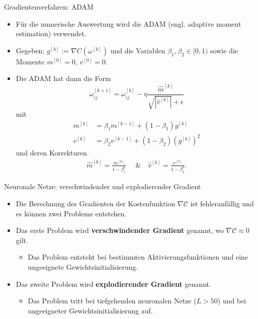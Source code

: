 \begin{frame}{Gradientenverfahren: ADAM}
    \begin{itemize}
        \item<1-> Für die numerische Auswertung wird die ADAM (engl. adaptive moment estimation) verwendet.
        \item<2-> Gegeben: $g^{[k]} := \nabla C(\omega^{[k]})$ und die Variablen $\beta_1,\beta_2 \in [0,1)$ sowie die Momente $m^{[0]}=0$,
        $v^{[0]}=0$.
        \item<3-> Die ADAM hat dann die Form
        \[
            \omega_{ij}^{[k+1]}= \omega_{ij}^{[k]} - \eta \frac{\hat{m}^{[k]}}{\sqrt{|\hat{v}^{[k]}|} + \epsilon}
        \]
        mit
        \begin{align*}
            m^{[k]} &= \beta_1 m^{[k-1]} + (1-\beta_1)g^{[k]} \\
            v^{[k]} &= \beta_2 v^{[k-1]} + (1-\beta_2)(g^{[k]})^2
        \end{align*}
        und deren Korrekturen
        \begin{align*}
            \hat{m}^{[k]} = \frac{m^{[k]}}{1-\beta_1^k} \quad \text{ \& } \quad  \hat{v}^{[k]} = \frac{v^{[k]}}{1-\beta_2^k}.
        \end{align*}
    \end{itemize}
\end{frame}

\begin{frame}{Neuronale Netze: verschwindender und explodierender Gradient}
    \begin{itemize}
        \item<1-> Die Berechnung des Gradienten der Kostenfunktion $\nabla \mathcal{C}$ ist fehleranfällig und es können
        zwei Probleme entstehen.
        \item<2-> Das erste Problem wird \textbf{verschwindender Gradient} genannt, wo $\nabla \mathcal{C}\approx0$ gilt.
        \begin{itemize}
            \item<1-> Das Problem entsteht bei bestimmten Aktivierungsfunktionen und eine ungeeignete Gewichtsinitialisierung.
        \end{itemize}
        \item<3-> Das zweite Problem wird \textbf{explodierender Gradient} genannt.
        \begin{itemize}
            \item<1-> Das Problem tritt bei tiefgehenden neuronalen Netze ($L>50$) und bei ungeeigneter
            Gewichtsinitialisierung auf.
        \end{itemize}
    \end{itemize}
\end{frame}

